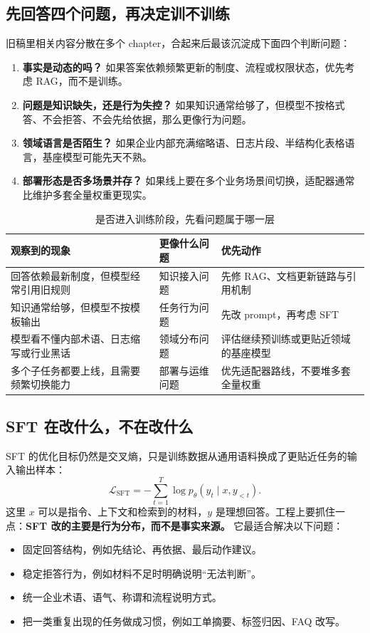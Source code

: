 \subsection{先回答四个问题，再决定训不训练}
旧稿里相关内容分散在多个 chapter，合起来后最该沉淀成下面四个判断问题：
\begin{enumerate}
  \item \textbf{事实是动态的吗？} 如果答案依赖频繁更新的制度、流程或权限状态，优先考虑 RAG，而不是训练。
  \item \textbf{问题是知识缺失，还是行为失控？} 如果知识通常给够了，但模型不按格式答、不会拒答、不会先给依据，那么更像行为问题。
  \item \textbf{领域语言是否陌生？} 如果企业内部充满缩略语、日志片段、半结构化表格语言，基座模型可能先天不熟。
  \item \textbf{部署形态是否多场景并存？} 如果线上要在多个业务场景间切换，适配器通常比维护多套全量权重更现实。
\end{enumerate}

\begin{table}[H]
\centering
\small
\begin{tabularx}{\textwidth}{>{\raggedright\arraybackslash}p{3.2cm}>{\raggedright\arraybackslash}p{3cm}>{\raggedright\arraybackslash}X}
\toprule
\textbf{观察到的现象} & \textbf{更像什么问题} & \textbf{优先动作} \\
\midrule
回答依赖最新制度，但模型经常引用旧规则 & 知识接入问题 & 先修 RAG、文档更新链路与引用机制 \\
知识通常给够，但模型不按模板输出 & 任务行为问题 & 先改 prompt，再考虑 SFT \\
模型看不懂内部术语、日志缩写或行业黑话 & 领域分布问题 & 评估继续预训练或更贴近领域的基座模型 \\
多个子任务都要上线，且需要频繁切换能力 & 部署与运维问题 & 优先适配器路线，不要堆多套全量权重 \\
\bottomrule
\end{tabularx}
\caption{是否进入训练阶段，先看问题属于哪一层}
\label{tab:finetune-routing}
\end{table}

\subsection{SFT 在改什么，不在改什么}
SFT 的优化目标仍然是交叉熵，只是训练数据从通用语料换成了更贴近任务的输入输出样本：
\[
\mathcal{L}_{\mathrm{SFT}}=-\sum_{t=1}^{T}\log p_\theta(y_t \mid x, y_{<t}).
\]
这里 \(x\) 可以是指令、上下文和检索到的材料，\(y\) 是理想回答。工程上要抓住一点：\textbf{SFT 改的主要是行为分布，而不是事实来源。} 它最适合解决以下问题：
\begin{itemize}
  \item 固定回答结构，例如先结论、再依据、最后动作建议。
  \item 稳定拒答行为，例如材料不足时明确说明“无法判断”。
  \item 统一企业术语、语气、称谓和流程说明方式。
  \item 把一类重复出现的任务做成习惯，例如工单摘要、标签归因、FAQ 改写。
\end{itemize}

